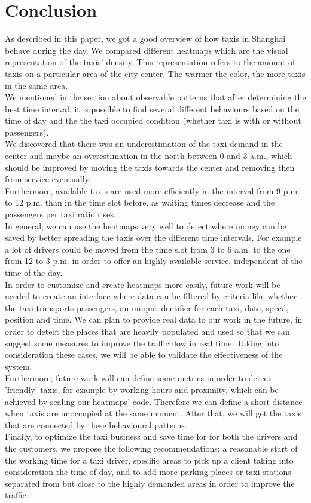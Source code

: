 \documentclass[11pt,conference,a4paper,twocolumns,romanappendices]{IEEEtran}
\begin{document}
\section{Conclusion}
As described in this paper, we got a good overview of how taxis in Shanghai behave during the day. We compared different heatmaps which are the visual representation of the taxis' density. This representation refers to the amount of taxis on a particular area of the city center. The warmer the color, the more taxis in the same area. \\
We mentioned in the section about observable patterns that after determining the best time interval, it is possible to find several different behaviours based on the time of day and the the taxi occupied condition (whether taxi is with or without passengers). \\
We discovered that there was an underestimation of the taxi demand in the center and maybe an overestimation in the north between 0 and 3 a.m., which should be improved by moving the taxis towards the center and removing then from service eventually. \\
Furthermore, available taxis are used more efficiently in the interval from 9 p.m. to 12 p.m. than in the time slot before, as waiting times decrease and the passengers per taxi ratio rises. \\
In general, we can use the heatmaps very well to detect where money can be saved by better spreading the taxis over the different time intervals. For example a lot of drivers could be moved from the time slot from 3 to 6 a.m. to the one from 12 to 3 p.m. in order to offer an highly available service, independent of the time of the day. \\
In order to customize and create heatmaps more easily, future work will be needed to create an interface where data can be filtered by criteria like whether the taxi transports passengers, an unique identifier for each taxi, date, speed, position and time. We can plan to provide real data to our work in the future, in order to detect the places that are heavily populated and used so that we can suggest some measures to improve the traffic flow in real time. Taking into consideration these cases, we will be able to validate the effectiveness of the system. \\
Furthermore, future work will can define some metrics in order to detect 'friendly' taxis, for example by working hours and proximity, which can be achieved by scaling our heatmaps' code. Therefore we can define a short distance when taxis are unoccupied at the same moment. After that, we will get the taxis that are connected by these behavioural patterns. \\
Finally, to optimize the taxi business and save time for for both the drivers and the customers, we propose the following recommendations: a reasonable start of the working time for a taxi driver, specific areas to pick up a client taking into consideration the time of day, and to add more parking places or taxi stations separated from but close to the highly demanded areas in order to improve the traffic.

\newpage



\end{document}
